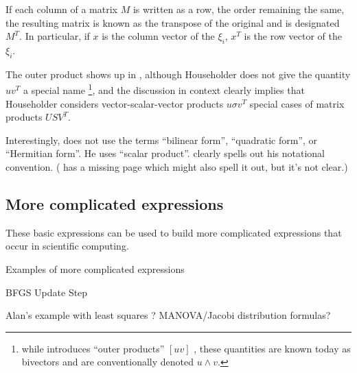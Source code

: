 If each column of a matrix $M$ is written as a row, the order remaining the same, the resulting matrix is known as the transpose of the original and is designated $M^T$. In particular, if $x$ is the column vector of the $\xi_i$, $x^T$ is the row vector of the $\xi_i$.

The outer product shows up in \cite[Sec. 2.24]{Householder1953}, although Householder does not give the quantity $u v^T$ a special name \footnote{while \cite[Sec. 2.03]{Householder1953} introduces ``outer products'' $[u v]$ , these quantities are known today as bivectors and are conventionally denoted $u \wedge v$.}, and the discussion in context clearly implies that Householder considers vector-scalar-vector products $u \sigma v^T$ special cases of matrix products $U S V^T$.

Interestingly, \cite{Householder1953} does not use the terms ``bilinear form'', ``quadratic form'', or ``Hermitian form''. He uses ``scalar product''. \cite{Householder1955} clearly spells out his notational convention. (\cite{Householder1953} has a missing page which might also spell it out, but it's not clear.)



\subsection{More complicated expressions}

These basic expressions can be used to build more complicated expressions that occur in scientific computing.

Examples of more complicated expressions

BFGS Update Step

Alan's example with least squares ? MANOVA/Jacobi distribution formulas?

